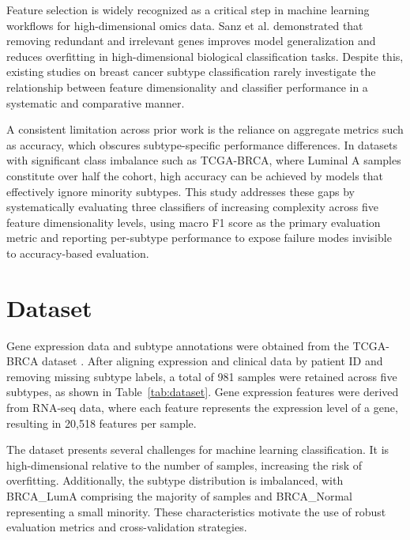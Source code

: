 \documentclass[10pt,twocolumn,letterpaper]{article}
\begin{document}
Feature selection is widely recognized as a critical step in machine learning workflows for high-dimensional omics data. Sanz et al. \cite{sanz2017} demonstrated that removing redundant and irrelevant genes improves model generalization and reduces overfitting in high-dimensional biological classification tasks. Despite this, existing studies on breast cancer subtype classification rarely investigate the relationship between feature dimensionality and classifier performance in a systematic and comparative manner.

A consistent limitation across prior work is the reliance on aggregate metrics such as accuracy, which obscures subtype-specific performance differences. In datasets with significant class imbalance such as TCGA-BRCA, where Luminal A samples constitute over half the cohort, high accuracy can be achieved by models that effectively ignore minority subtypes. This study addresses these gaps by systematically evaluating three classifiers of increasing complexity across five feature dimensionality levels, using macro F1 score as the primary evaluation metric and reporting per-subtype performance to expose failure modes invisible to accuracy-based evaluation.

\FloatBarrier
\section{Dataset}

Gene expression data and subtype annotations were obtained from the TCGA-BRCA dataset \cite{weinstein2013}. After aligning expression and clinical data by patient ID and removing missing subtype labels, a total of 981 samples were retained across five subtypes, as shown in Table~\ref{tab:dataset}. Gene expression features were derived from RNA-seq data, where each feature represents the expression level of a gene, resulting in 20,518 features per sample.

The dataset presents several challenges for machine learning classification. It is high-dimensional relative to the number of samples, increasing the risk of overfitting. Additionally, the subtype distribution is imbalanced, with BRCA\_LumA comprising the majority of samples and BRCA\_Normal representing a small minority. These characteristics motivate the use of robust evaluation metrics and cross-validation strategies.
\end{document}
